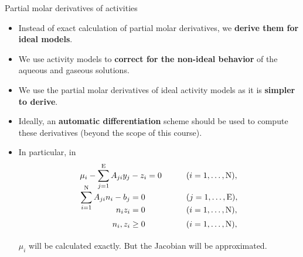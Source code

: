 \begin{frame}{Partial molar derivatives of activities}
\begin{itemize}[<+->]
\item Instead of exact calculation of partial molar derivatives, 
we {\bf derive  them for ideal models}.
\item We use activity models to {\bf correct for the non-ideal behavior}
of the aqueous and gaseous solutions.
\item We use the partial molar derivatives of ideal activity models as it is {\bf simpler to derive}. 
\item Ideally, an \alert{\bf automatic differentiation} scheme should be used
to compute these derivatives (beyond the scope of this course).
%
\item In particular, in\\[-30pt]
%
\begin{alignat*}{2}
	\mu_{i}-\sum_{j=1}^{\text{E}}A_{ji}y_{j} & -z_{i}=0 & \qquad\vphantom{\frac{\partial L}{\partial y_{j}}} & (i=1,\ldots,\text{N}),\\[-10pt]
	\sum_{i=1}^{\text{N}}A_{ji}n_{i}-b_{j} & =0 & \vphantom{\frac{\partial L}{\partial y_{j}}} & (j=1,\ldots,\text{E}),\\[-15pt]
	n_{i}z_{i} & =0 & \vphantom{\frac{\partial L}{\partial y_{j}}} & (i=1,\ldots,\text{N}),\\[-10pt]
	n_{i},z_{i} & \geq0 & \vphantom{\frac{\partial L}{\partial y_{j}}} & (i=1,\ldots,\text{N}),
\end{alignat*}
%
$\mu_{i}$ will be calculated exactly. But the Jacobian will be approximated.
%
\end{itemize}

\end{frame}
%
%
